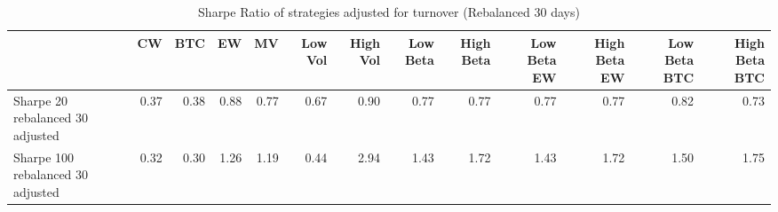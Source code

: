\begin{table}
\centering
\caption{Sharpe Ratio of strategies adjusted for turnover (Rebalanced 30 days)}
\label{sharpe30}
\begin{tabular}{lrrrrrrrrrrrr}
\toprule
{} &   CW &  BTC &   EW &   MV &  Low Vol &  High Vol &  Low Beta &  High Beta &  Low Beta EW &  High Beta EW &  Low Beta BTC &  High Beta BTC \\
\midrule
Sharpe 20 rebalanced 30 adjusted  & 0.37 & 0.38 & 0.88 & 0.77 &     0.67 &      0.90 &      0.77 &       0.77 &         0.77 &          0.77 &          0.82 &           0.73 \\
Sharpe 100 rebalanced 30 adjusted & 0.32 & 0.30 & 1.26 & 1.19 &     0.44 &      2.94 &      1.43 &       1.72 &         1.43 &          1.72 &          1.50 &           1.75 \\
\bottomrule
\end{tabular}
\end{table}
